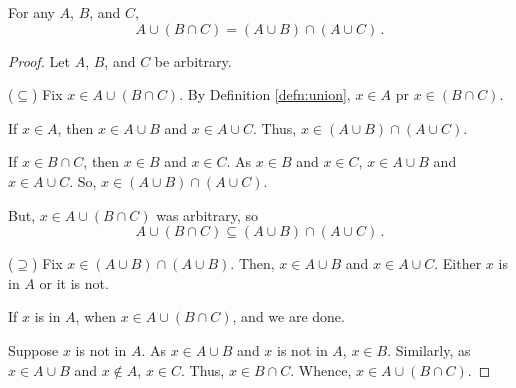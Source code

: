 \guard





\begin{prop}
\label{prop:unionDistributionOverIntersection}
  For any $A$, $B$, and $C$, \[ A\cup( B\cap C) = (A\cup B) \cap (A\cup C)\,. \]
\end{prop}
\begin{proof}
  Let $A$, $B$, and $C$ be arbitrary.

  ($\subseteq$) Fix $x\in A\cup( B\cap C)$.
    By Definition \ref{defn:union},  $x\in A$ pr $x\in(B\cap C)$.

    If $x\in A$, then $x\in A\cup B$ and $x\in A\cup C$.
    Thus, $x\in (A\cup B) \cap (A\cup C)$.

    If $x\in B\cap C$, then $x\in B$ and $x\in C$.
    As $x\in B$ and $x\in C$, $x\in A\cup B$ and $x\in A\cup C$.
    So, $x\in (A\cup B) \cap (A\cup C)$.

    But, $x\in  A\cup( B\cap C)$ was arbitrary, so \[ A\cup( B\cap C) \subseteq (A\cup B) \cap (A\cup C)\,.\]

  ($\supseteq$) Fix $x\in (A\cup B)\cap (A\cup B)$.
  Then, $x\in A\cup B$ and $x\in A\cup C$.
  Either $x$ is in $A$ or it is not.

  If $x$ is in $A$, when $x\in A\cup(B\cap C)$, and we are done.

  Suppose $x$ is not in $A$.
  As $x\in A\cup B$ and $x$ is not in $A$, $x\in B$.
  Similarly, as $x\in A\cup B$ and $x\not\in A$, $x\in C$.
  Thus, $x\in B\cap C$.
  Whence, $x\in A\cup(B\cap C)$.
\end{proof}
